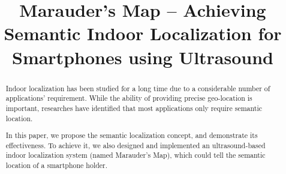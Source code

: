 \documentclass[conference, 11pt]{IEEEtran}
\begin{document}
\title{Marauder's Map -- Achieving Semantic Indoor Localization for Smartphones using Ultrasound}

\author{
\and
{}
\and
{}
}

\maketitle

\begin{abstract}
Indoor localization has been studied for a long time due to a considerable number of applications' requirement. While the ability of providing precise geo-location is important, researches have identified that most applications only require semantic location.

In this paper, we propose the semantic localization concept, and demonstrate its effectiveness. To achieve it, we also designed and implemented an ultrasound-based indoor localization system (named Marauder's Map), which could tell the semantic location of a smartphone holder.
\end{abstract}









\end{document}

